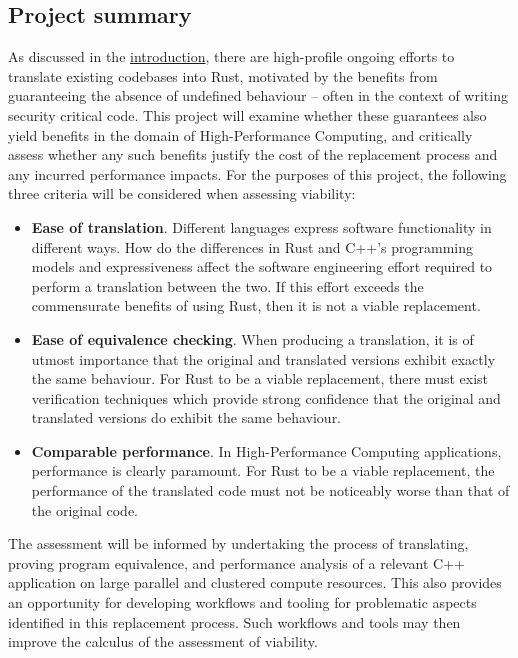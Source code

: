 \subsection{Project summary}
\label{ssec:objectives-summary}

As discussed in the \hyperref[ch:introduction]{introduction}, there are high-profile ongoing efforts to translate existing codebases into Rust, motivated by the benefits from guaranteeing the absence of undefined behaviour -- often in the context of writing security critical code. This project will examine whether these guarantees also yield benefits in the domain of High-Performance Computing, and critically assess whether any such benefits justify the cost of the replacement process and any incurred performance impacts. For the purposes of this project, the following three criteria will be considered when assessing viability:

\begin{itemize}
    \item \textbf{Ease of translation}. Different languages express software functionality in different ways. How do the differences in Rust and C++'s programming models and expressiveness affect the software engineering effort required to perform a translation between the two. If this effort exceeds the commensurate benefits of using Rust, then it is not a viable replacement.
    \item \textbf{Ease of equivalence checking}. When producing a translation, it is of utmost importance that the original and translated versions exhibit exactly the same behaviour. For Rust to be a viable replacement, there must exist verification techniques which provide strong confidence that the original and translated versions do exhibit the same behaviour.
    \item \textbf{Comparable performance}. In High-Performance Computing applications, performance is clearly paramount. For Rust to be a viable replacement, the performance of the translated code must not be noticeably worse than that of the original code.
\end{itemize}

The assessment will be informed by undertaking the process of translating, proving program equivalence, and performance analysis of a relevant C++ application on large parallel and clustered compute resources. This also provides an opportunity for developing workflows and tooling for problematic aspects identified in this replacement process. Such workflows and tools may then improve the calculus of the assessment of viability.

